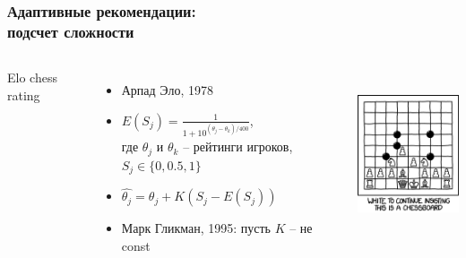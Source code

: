 \documentclass{beamer}
\begin{document}
\begin{frame}\frametitle{Адаптивные рекомендации: \\подсчет сложности}
       \begin{columns}
              Elo chess rating
              \begin{itemize}
                \item Арпад Эло, 1978\cite{elo1978rating}
                \item $E(S_j) = \frac{1}{1 + 10 ^ {(\theta_j - \theta_k) / 400}}$, \\где $\theta_j$ и $\theta_k$ -- рейтинги игроков, $S_j \in \{0, 0.5, 1\}$
                \item $\hat{\theta_j} = \theta_j + K(S_j - E(S_j))$
                \item Марк Гликман, 1995: пусть $K$ -- не const \cite{glickman95}
              \end{itemize}
              \centering
              \includegraphics[height=5cm, width=3.5cm]{images/chess.png}
         \end{columns} 
\end{frame}
\end{document}
